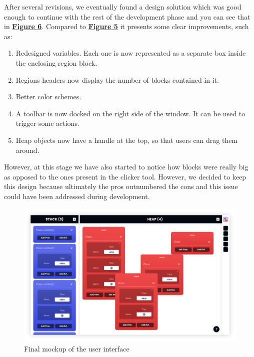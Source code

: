 \documentclass[]{usiinfbachelorproject}
\begin{document}
\noindent After several revisions, we eventually found a design solution which was good enough to continue with the rest of the development phase and you can see that in \hyperref[final ui]{\textbf{Figure 6}}. Compared to \hyperref[separate regions]{\textbf{Figure 5}} it presents some clear improvements, such as:

\begin{enumerate}
	\item Redesigned variables. Each one is now represented as a separate box inside the enclosing region block.
	\item Regions headers now display the number of blocks contained in it.
	\item Better color schemes.
	\item A toolbar is now docked on the right side of the window. It can be used to trigger some actions.
	\item Heap objects now have a handle at the top, so that users can drag them around.
\end{enumerate}

\noindent However, at this stage we have also started to notice how blocks were really big as opposed to the ones present in the clicker tool. However, we decided to keep this design because ultimately the pros outnumbered the cons and this issue could have been addressed during development.

\vspace{\fill}

\pagebreak

\begin{figure}[h!]
\centering
\includegraphics[width=\textwidth]{figures/final_mockup.png}
\caption {Final mockup of the user interface}
\label{final ui}
\end{figure}
\end{document}
